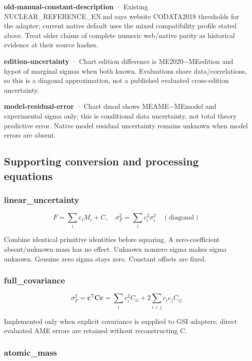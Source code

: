 \documentclass[
  11pt,
  letterpaper,
]{article}
\begin{document}
\textbf{old-manual-constant-description} · Existing
NUCLEAR\_REFERENCE\_EN.md says website CODATA2018 thresholds for the
adapter; current native default uses the mixed compatibility profile
stated above. Treat older claims of complete numeric web/native parity
as historical evidence at their source hashes.

\textbf{edition-uncertainty} · Chart edition difference is
ME2020−MEedition and hypot of marginal sigmas when both known.
Evaluations share data/correlations, so this is a diagonal
approximation, not a published evaluated cross-edition uncertainty.

\textbf{model-residual-error} · Chart dmod shows MEAME−MEmodel and
experimental sigma only; this is conditional data uncertainty, not total
theory predictive error. Native model residual uncertainty remains
unknown when model errors are absent.

\subsection{Supporting conversion and processing
equations}\label{supporting-conversion-and-processing-equations}

\subsubsection{linear\_uncertainty}\label{linear_uncertainty}

\[
F=\sum_i c_i M_i+C,\quad \sigma_F^2=\sum_i c_i^2\sigma_i^2\quad(\mathrm{diagonal})
\]

Combine identical primitive identities before squaring. A
zero-coefficient absent/unknown mass has no effect. Unknown nonzero
sigma makes sigma unknown. Genuine zero sigma stays zero. Constant
offsets are fixed.

\subsubsection{full\_covariance}\label{full_covariance}

\[
\sigma_F^2=\boldsymbol c^\mathsf{T}\mathbf C\boldsymbol c=\sum_i c_i^2C_{ii}+2\sum_{i<j}c_ic_jC_{ij}
\]

Implemented only when explicit covariance is supplied to GSI adapters;
direct evaluated AME errors are retained without reconstructing C.

\subsubsection{atomic\_mass}\label{atomic_mass}
\end{document}
